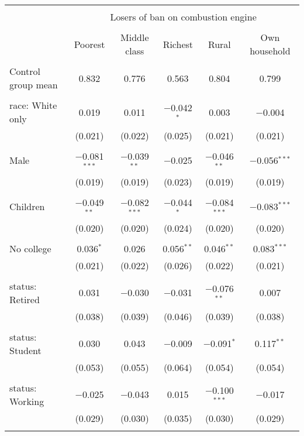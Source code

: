 
\begin{tabular}{@{\extracolsep{5pt}}lccccc} 
\\[-1.8ex]\hline 
\hline \\[-1.8ex] 
 & \multicolumn{5}{c}{Losers of ban on combustion engine} \\ 
\cline{2-6} 
\\[-1.8ex] & Poorest & Middle class & Richest & Rural & Own household \\ 
\hline \\[-1.8ex] 
 Control group mean & 0.832 & 0.776 & 0.563 & 0.804 & 0.799  \\ \hline \\[-1.8ex] race: White only & 0.019 & 0.011 & $-$0.042$^{*}$ & 0.003 & $-$0.004 \\ 
  & (0.021) & (0.022) & (0.025) & (0.021) & (0.021) \\ 
  & & & & & \\ 
 Male & $-$0.081$^{***}$ & $-$0.039$^{**}$ & $-$0.025 & $-$0.046$^{**}$ & $-$0.056$^{***}$ \\ 
  & (0.019) & (0.019) & (0.023) & (0.019) & (0.019) \\ 
  & & & & & \\ 
 Children & $-$0.049$^{**}$ & $-$0.082$^{***}$ & $-$0.044$^{*}$ & $-$0.084$^{***}$ & $-$0.083$^{***}$ \\ 
  & (0.020) & (0.020) & (0.024) & (0.020) & (0.020) \\ 
  & & & & & \\ 
 No college & 0.036$^{*}$ & 0.026 & 0.056$^{**}$ & 0.046$^{**}$ & 0.083$^{***}$ \\ 
  & (0.021) & (0.022) & (0.026) & (0.022) & (0.021) \\ 
  & & & & & \\ 
 status: Retired & 0.031 & $-$0.030 & $-$0.031 & $-$0.076$^{**}$ & 0.007 \\ 
  & (0.038) & (0.039) & (0.046) & (0.039) & (0.038) \\ 
  & & & & & \\ 
 status: Student & 0.030 & 0.043 & $-$0.009 & $-$0.091$^{*}$ & 0.117$^{**}$ \\ 
  & (0.053) & (0.055) & (0.064) & (0.054) & (0.054) \\ 
  & & & & & \\ 
 status: Working & $-$0.025 & $-$0.043 & 0.015 & $-$0.100$^{***}$ & $-$0.017 \\ 
  & (0.029) & (0.030) & (0.035) & (0.030) & (0.029) \\ 
  & & & & & \\ 

\end{tabular}
